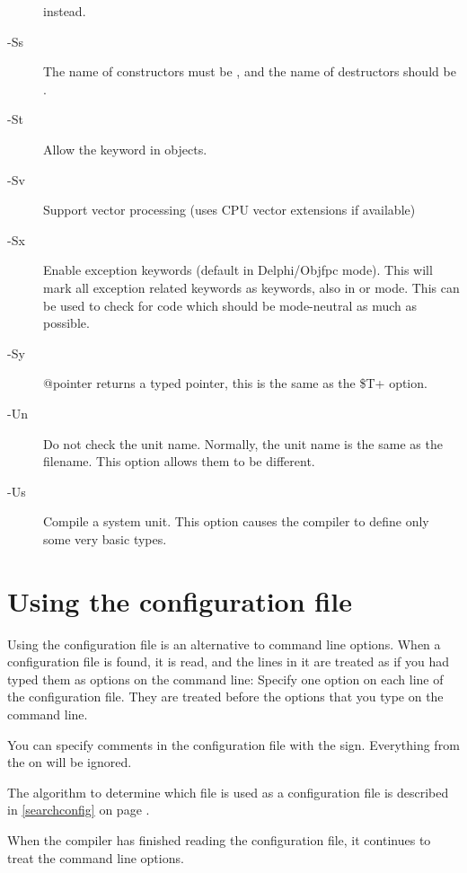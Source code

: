 \begin{description}
 instead.
\item [-Ss]  The name of constructors must be , and the
name of destructors should be .
\item [-St]  Allow the  keyword in objects.
\item[-Sv] Support vector processing (uses CPU vector extensions if available)
\item [-Sx] Enable exception keywords (default in Delphi/Objfpc mode). This
will mark all exception related keywords as keywords, also in \tp or
 mode. This can be used to check for code which should be
mode-neutral as much as possible.
\item [-Sy]  @pointer returns a typed pointer, this is the same as the \$T+ option.

\item [-Un]  Do not check the unit name. Normally, the unit name
is the same as the filename. This option allows them to be different.
\item [-Us]  Compile a system unit. This option causes the
compiler to define only some very basic types.
\end{description}


\section{Using the configuration file}
\label{se:configfile}
Using the configuration file  is an alternative to command
line options. When a configuration file is found, it is read, and the lines
in it are treated as if you had typed them as options on the command line: 
Specify one option on each line of the configuration file. They are treated
before the options that you type on the command line.

You can specify comments in the configuration file with the \var{\#} sign.
Everything from the \var{\#} on will be ignored.

The algorithm to determine which file is used as a configuration file
is described in \ref{searchconfig} on page \pageref{searchconfig}.

When the compiler has finished reading the configuration file, it continues
to treat the command line options. 

